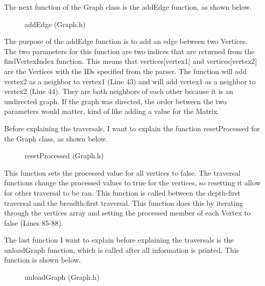 \documentclass[letterpaper, 10pt]{article}
\begin{document}
\vspace{1em}
\noindent
The next function of the Graph class is the addEdge function, as shown below.
\begin{figure}[H]
  \centering
   
  \caption{addEdge (Graph.h)}
  \label{fig:figure2.15}
\end{figure}

\noindent
The purpose of the addEdge function is to add an edge between two Vertices. The two parameters for this function are two indices that are returned from the findVertexIndex function. This means that vertices[vertex1] and vertices[vertex2] are the Vertices with the IDs specified from the parser. The function will add vertex2 as a neighbor to vertex1 (Line 43) and will add vertex1 as a neighbor to vertex2 (Line 44). They are both neighbors of each other because it is an undirected graph. If the graph was directed, the order between the two parameters would matter, kind of like adding a value for the Matrix.

\vspace{1em}
\noindent
Before explaining the traversals, I want to explain the function resetProcessed for the Graph class, as shown below.
\begin{figure}[H]
  \centering
   
  \caption{resetProcessed (Graph.h)}
  \label{fig:figure2.16}
\end{figure}

\noindent
This function sets the processed value for all vertices to false. The traversal functions change the processed values to true for the vertices, so resetting it allow for other traversal to be ran. This function is called between the depth-first traversal and the breadth-first traversal. This function does this by iterating through the vertices array and setting the processed member of each Vertex to false (Lines 85-88).

\vspace{1em}
\noindent
The last function I want to explain before explaining the traversals is the unloadGraph function, which is called after all information is printed. This function is shown below.

\begin{figure}[H]
  \centering
   
  \caption{unloadGraph (Graph.h)}
  \label{fig:figure2.17}
\end{figure}
\end{document}
